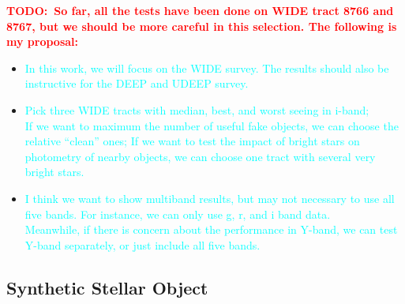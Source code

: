 \documentclass[preprint]{aastex}
\newcommand{\todo}[1]{\textcolor{red}{\textbf{TODO:~#1}}}
\newcommand{\plan}[1]{\textcolor{cyan}{#1}}
\begin{document}
    \todo{So far, all the tests have been done on WIDE tract 8766 and 8767, but we 
          should be more careful in this selection. The following is my proposal:}
    \begin{itemize}
        \item \plan{In this work, we will focus on the WIDE survey.  The results 
                    should also be instructive for the DEEP and UDEEP survey.} 
        \item \plan{Pick three WIDE tracts with median, best, and worst seeing in 
                    i-band;  \\
                    If we want to maximum the number of useful fake objects, 
                    we can choose the relative ``clean'' ones; 
                    If we want to test the impact of bright stars on photometry of 
                    nearby objects, we can choose one tract with several very bright 
                    stars.} 
        \item \plan{I think we want to show multiband results, but may not necessary 
                    to use all five bands.  
                    For instance, we can only use g, r, and i band data. \\
                    Meanwhile, if there is concern about the performance in Y-band, 
                    we can test Y-band separately, or just include all five bands.}
    \end{itemize}
    
\subsection{Synthetic Stellar Object}
\end{document}
